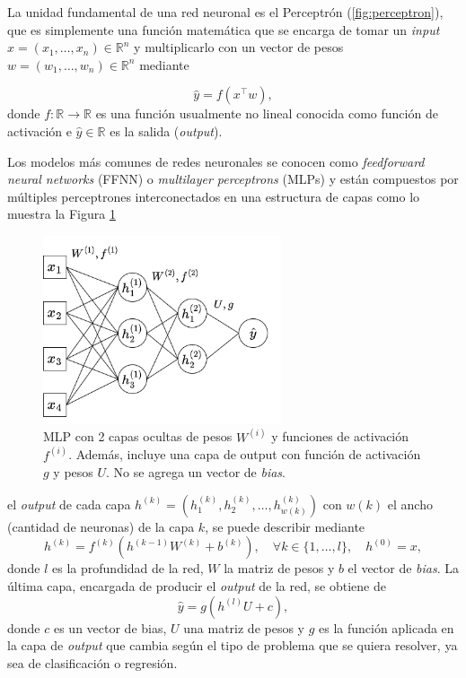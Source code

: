 \vspace{0.2cm}

La unidad fundamental de una red neuronal es el Perceptrón (\ref{fig:perceptron}), que es simplemente una función matemática que se encarga de tomar un \textit{input} $x = (x_1 , \dots , x_n) \in \mathbb{R}^n$  y multiplicarlo con un vector de pesos $w = (w_1 , \dots , w_n) \in \mathbb{R}^n$ mediante

\[
\hat{y} = f(x^{\top}w) , 
\]
donde $f: \mathbb{R} \rightarrow \mathbb{R}$ es una función usualmente no lineal conocida como función de activación e $\hat{y} \in \mathbb{R}$ es la salida (\textit{output}).  

\vspace{0.2cm}

Los modelos más comunes de redes neuronales se conocen como \textit{feedforward neural networks} (FFNN) o \textit{multilayer perceptrons} (MLPs) y están compuestos por múltiples perceptrones interconectados en una estructura de capas como lo muestra la Figura \ref{fig:MLPs}

\begin{figure}[h]
    \centering
    \includegraphics[width=7cm]{img/tesis/MLPs.png}
    \caption{MLP con 2 capas ocultas de pesos $W^{(i)}$ y funciones de activación $f^{(i)}$. Además, incluye una capa de output con función de activación $g$ y pesos $U$. No se agrega un vector de \textit{bias}. }
    \label{fig:MLPs}
\end{figure}

\noindent el \textit{output} de cada capa $h^{(k)} = (h^{(k)}_1 , h^{(k)}_2 , \dots , h^{(k)}_{w(k)})$ con $w(k)$ el ancho (cantidad de neuronas) de la capa $k$, se puede describir mediante 
\[
h^{(k)} = f^{(k)}(h^{(k-1)}W^{(k)}  + b^{(k)} ), \quad \forall k \in \{ 1 , \dots , l \} , \quad h^{(0)} = x ,   
\]
donde $l$ es la profundidad de la red, $W$ la matriz de pesos y $b$ el vector de \textit{bias}. La última capa, encargada de producir el \textit{output} de la red, se obtiene de 
\[
\hat{y} = g(h^{(l)}U + c ) , 
\]
donde $c$ es un vector de bias, $U$ una matriz de pesos y $g$ es la función aplicada en la capa de \textit{output} que cambia según el tipo de problema que se quiera resolver, ya sea de clasificación o regresión. 

